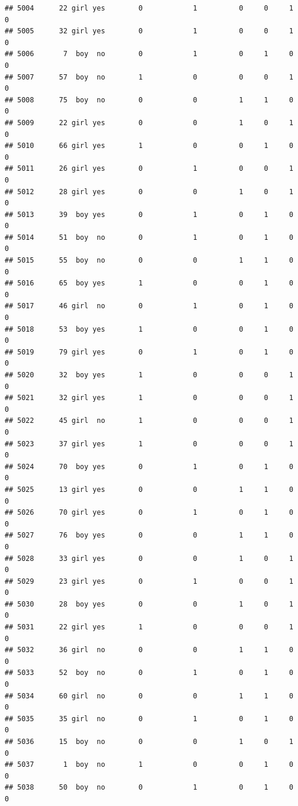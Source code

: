 \documentclass[man]{apa6}
\begin{document}
\begin{verbatim}
## 5004      22 girl yes        0            1          0     0     1     0
## 5005      32 girl yes        0            1          0     0     1     0
## 5006       7  boy  no        0            1          0     1     0     0
## 5007      57  boy  no        1            0          0     0     1     0
## 5008      75  boy  no        0            0          1     1     0     0
## 5009      22 girl yes        0            0          1     0     1     0
## 5010      66 girl yes        1            0          0     1     0     0
## 5011      26 girl yes        0            1          0     0     1     0
## 5012      28 girl yes        0            0          1     0     1     0
## 5013      39  boy yes        0            1          0     1     0     0
## 5014      51  boy  no        0            1          0     1     0     0
## 5015      55  boy  no        0            0          1     1     0     0
## 5016      65  boy yes        1            0          0     1     0     0
## 5017      46 girl  no        0            1          0     1     0     0
## 5018      53  boy yes        1            0          0     1     0     0
## 5019      79 girl yes        0            1          0     1     0     0
## 5020      32  boy yes        1            0          0     0     1     0
## 5021      32 girl yes        1            0          0     0     1     0
## 5022      45 girl  no        1            0          0     0     1     0
## 5023      37 girl yes        1            0          0     0     1     0
## 5024      70  boy yes        0            1          0     1     0     0
## 5025      13 girl yes        0            0          1     1     0     0
## 5026      70 girl yes        0            1          0     1     0     0
## 5027      76  boy yes        0            0          1     1     0     0
## 5028      33 girl yes        0            0          1     0     1     0
## 5029      23 girl yes        0            1          0     0     1     0
## 5030      28  boy yes        0            0          1     0     1     0
## 5031      22 girl yes        1            0          0     0     1     0
## 5032      36 girl  no        0            0          1     1     0     0
## 5033      52  boy  no        0            1          0     1     0     0
## 5034      60 girl  no        0            0          1     1     0     0
## 5035      35 girl  no        0            1          0     1     0     0
## 5036      15  boy  no        0            0          1     0     1     0
## 5037       1  boy  no        1            0          0     1     0     0
## 5038      50  boy  no        0            1          0     1     0     0

\end{verbatim}
\end{document}
